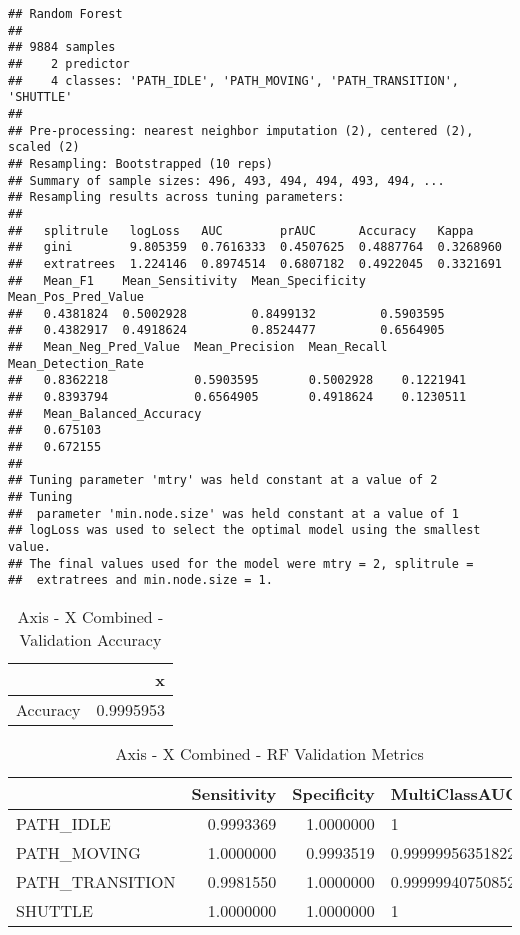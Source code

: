 \documentclass[]{article}
\begin{document}
\begin{verbatim}
## Random Forest 
## 
## 9884 samples
##    2 predictor
##    4 classes: 'PATH_IDLE', 'PATH_MOVING', 'PATH_TRANSITION', 'SHUTTLE' 
## 
## Pre-processing: nearest neighbor imputation (2), centered (2), scaled (2) 
## Resampling: Bootstrapped (10 reps) 
## Summary of sample sizes: 496, 493, 494, 494, 493, 494, ... 
## Resampling results across tuning parameters:
## 
##   splitrule   logLoss   AUC        prAUC      Accuracy   Kappa    
##   gini        9.805359  0.7616333  0.4507625  0.4887764  0.3268960
##   extratrees  1.224146  0.8974514  0.6807182  0.4922045  0.3321691
##   Mean_F1    Mean_Sensitivity  Mean_Specificity  Mean_Pos_Pred_Value
##   0.4381824  0.5002928         0.8499132         0.5903595          
##   0.4382917  0.4918624         0.8524477         0.6564905          
##   Mean_Neg_Pred_Value  Mean_Precision  Mean_Recall  Mean_Detection_Rate
##   0.8362218            0.5903595       0.5002928    0.1221941          
##   0.8393794            0.6564905       0.4918624    0.1230511          
##   Mean_Balanced_Accuracy
##   0.675103              
##   0.672155              
## 
## Tuning parameter 'mtry' was held constant at a value of 2
## Tuning
##  parameter 'min.node.size' was held constant at a value of 1
## logLoss was used to select the optimal model using the smallest value.
## The final values used for the model were mtry = 2, splitrule =
##  extratrees and min.node.size = 1.
\end{verbatim}

\begin{table}[!h]

\caption{\label{tab:sensor-x-combined-rf-results}Axis - X Combined - Validation Accuracy}
\centering
\begin{tabular}[t]{lr}
\toprule
  & x\\
\midrule
Accuracy & 0.9995953\\
\bottomrule
\end{tabular}
\end{table}

\begin{table}[!h]

\caption{\label{tab:sensor-x-combined-rf-results}Axis - X Combined - RF Validation Metrics}
\centering
\begin{tabular}[t]{lrrl}
\toprule
  & Sensitivity & Specificity & MultiClassAUC\\
\midrule
PATH\_IDLE & 0.9993369 & 1.0000000 & 1\\
PATH\_MOVING & 1.0000000 & 0.9993519 & 0.999999563518225\\
PATH\_TRANSITION & 0.9981550 & 1.0000000 & 0.999999407508526\\
SHUTTLE & 1.0000000 & 1.0000000 & 1\\
\bottomrule
\end{tabular}
\end{table}
\end{document}
